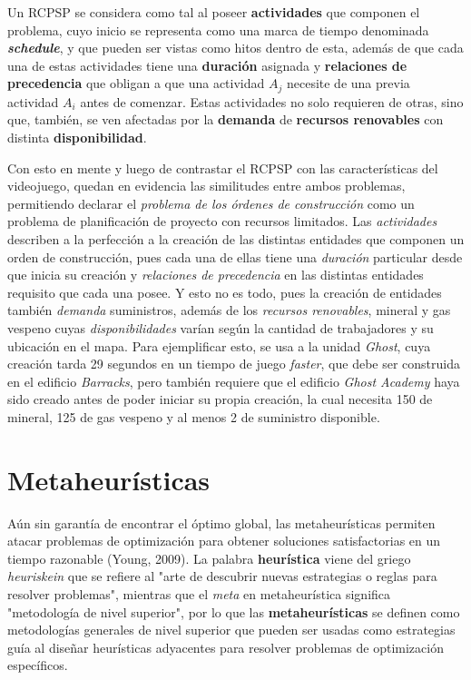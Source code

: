 Un RCPSP se considera como tal al poseer \textbf{actividades} que componen el problema, cuyo inicio se representa como una marca de tiempo denominada \textit{\textbf{schedule}}, y que pueden ser vistas como hitos dentro de esta, además de que cada una de estas actividades tiene una \textbf{duración} asignada y \textbf{relaciones de precedencia} que obligan a que una actividad $A_{j}$ necesite de una previa actividad $A_{i}$ antes de comenzar. Estas actividades no solo requieren de otras, sino que, también, se ven afectadas por la \textbf{demanda} de \textbf{recursos renovables} con distinta \textbf{disponibilidad}.

Con esto en mente y luego de contrastar el RCPSP con las características del videojuego, quedan en evidencia las similitudes entre ambos problemas, permitiendo declarar el \textit{problema de los órdenes de construcción} como un problema de planificación de proyecto con recursos limitados. Las \textit{actividades} describen a la perfección a la creación de las distintas entidades que componen un orden de construcción, pues cada una de ellas tiene una \textit{duración} particular desde que inicia su creación y \textit{relaciones de precedencia} en las distintas entidades requisito que cada una posee. Y esto no es todo, pues la creación de entidades también \textit{demanda} suministros, además de los \textit{recursos renovables}, mineral y gas vespeno cuyas \textit{disponibilidades} varían según la cantidad de trabajadores y su ubicación en el mapa. Para ejemplificar esto, se usa a la unidad \textit{Ghost}, cuya creación tarda 29 segundos en un tiempo de juego \textit{faster}, que debe ser construida en el edificio \textit{Barracks}, pero también requiere que el edificio \textit{Ghost Academy} haya sido creado antes de poder iniciar su propia creación, la cual necesita 150 de mineral, 125 de gas vespeno y al menos 2 de suministro disponible.

\section{Metaheurísticas}

Aún sin garantía de encontrar el óptimo global, las metaheurísticas permiten atacar problemas de optimización para obtener soluciones satisfactorias en un tiempo razonable (Young, 2009). La palabra \textbf{heurística} viene del griego \textit{heuriskein} que se refiere al "arte de descubrir nuevas estrategias o reglas para resolver problemas", mientras que el \textit{meta} en metaheurística significa "metodología de nivel superior", por lo que las \textbf{metaheurísticas} se definen como metodologías generales de nivel superior que pueden ser usadas como estrategias guía al diseñar heurísticas adyacentes para resolver problemas de optimización específicos.

